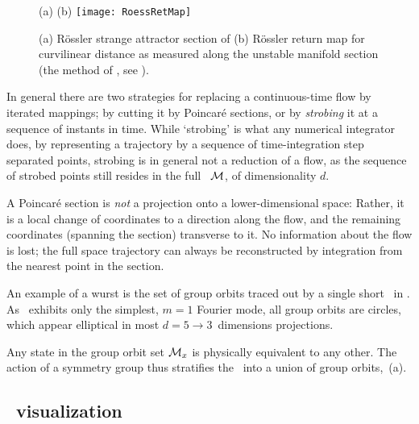 \begin{figure}
\begin{center}
(a) %
(b) \texttt{[image: RoessRetMap]}
\end{center}
  \caption{
(a) R\"ossler strange attractor section of 
(b) R\"ossler return map for curvilinear distance as measured
along the unstable manifold section (the method of
, see ).
  }
\label{fig:RoessRetMap}
\end{figure}

In general there are two strategies for replacing a continuous-time flow
by iterated mappings; by cutting it by Poincar\'e sections, or by
\emph{strobing} it at a sequence of instants in time. While
`strobing' is what any numerical integrator does, by representing a
trajectory by a sequence of time-integration step separated points,
strobing is in general not a reduction of a flow, as the sequence of
strobed points still resides in the full \statesp\ ${\cal M}$, of
dimensionality $d$.

A Poincar\'e section is {\em not} a projection onto a lower-dimensional
space: Rather, it is a local change of coordinates to a direction along
the flow, and the remaining coordinates (spanning the section) transverse
to it. No information about the flow is lost; the full space trajectory
can always be reconstructed by integration from the nearest point in the
section.


An example of a wurst is the set of group orbits traced out by a single
short \rpo\ in . As \cLe\ exhibits only the simplest,
$m=1$ Fourier mode, all group orbits are circles, which appear elliptical in
most $d=5 \to 3$~dimensions projections.
    \color{black}\fi

Any state in the  group orbit set ${\cal M}_{x}$
is physically equivalent to any other. The action of a symmetry group
thus stratifies the \statesp\ into a union of group orbits,
\,{(a)}.

\subsection{\Statesp\ visualization}

